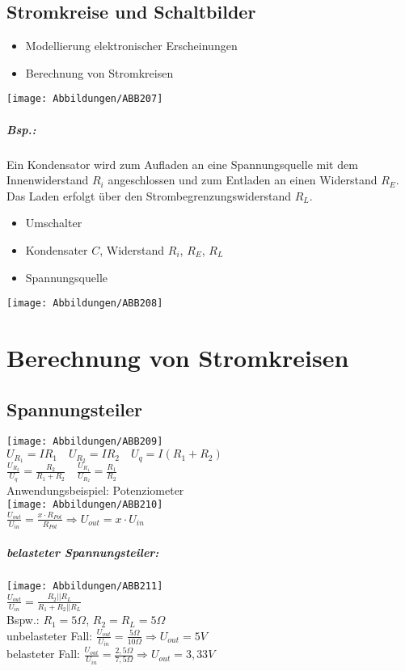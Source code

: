 \documentclass{scrreprt}
\begin{document}
\section{Stromkreise und Schaltbilder}
\begin{itemize}
\item Modellierung elektronischer Erscheinungen
\item Berechnung von Stromkreisen
\end{itemize}
\texttt{[image: Abbildungen/ABB207]}

\paragraph{Bsp.:} Ein Kondensator wird zum Aufladen an eine Spannungsquelle mit dem Innenwiderstand $R_i$ angeschlossen und zum Entladen an einen Widerstand $R_E$. Das Laden erfolgt über den Strombegrenzungswiderstand $R_L$.
\begin{itemize}
\item Umschalter
\item Kondensater $C$, Widerstand $R_i$, $R_E$, $R_L$
\item Spannungsquelle
\end{itemize}
\texttt{[image: Abbildungen/ABB208]}

\chapter{Berechnung von Stromkreisen}

\section{Spannungsteiler}

\texttt{[image: Abbildungen/ABB209]}\\
$U_{R_1}=IR_1 \quad U_{R_2}=IR_2 \quad U_q= I(R_1+R_2)$\\
$\frac{U_{R_2}}{U_q}=\frac{R_2}{R_1+R_2} \quad \frac{U_{R_1}}{U_{R_2}}=\frac{R_1}{R_2}$\\
Anwendungsbeispiel: Potenziometer\\
\texttt{[image: Abbildungen/ABB210]}\\
$\frac{U_{out}}{U_{in}}=\frac{x\cdot R_{Pot}}{R_{Pot}}\Rightarrow U_{out} = x \cdot U_{in}$
\paragraph{belasteter Spannungsteiler:}\parskp
\texttt{[image: Abbildungen/ABB211]}\\
$\frac{U_{out}}{U_{in}}=\frac{R_2||R_L}{R_1+R_2||R_L}$\\
Bspw.: $R_1=5 \Omega$, $R_2=R_L=5 \Omega$\\
unbelasteter Fall: $\frac{U_{out}}{U_{in}}=\frac{5 \Omega}{10 \Omega} \Rightarrow U_{out}=5V$\\
belasteter Fall: $\frac{U_{out}}{U_{in}}=\frac{2,5 \Omega}{7,5 \Omega}\Rightarrow U_{out}=3,33V$
\end{document}
